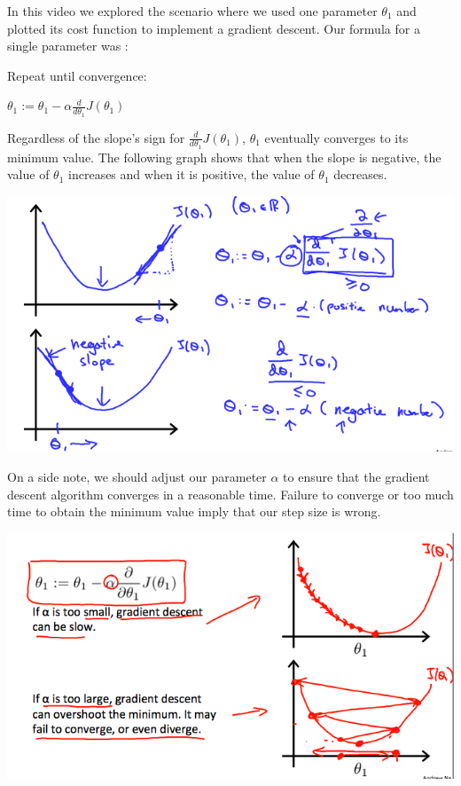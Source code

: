 \documentclass[
]{article}
\begin{document}
In this video we explored the scenario where we used one parameter
\(\theta_1\) and plotted its cost function to implement a gradient
descent. Our formula for a single parameter was :

Repeat until convergence:

\(\theta_1:=\theta_1-\alpha \frac{d}{d\theta_1} J(\theta_1)\)

Regardless of the slope's sign for \(\frac{d}{d\theta_1} J(\theta_1)\),
\(\theta_1\) eventually converges to its minimum value. The following
graph shows that when the slope is negative, the value of \(\theta_1\)
increases and when it is positive, the value of \(\theta_1\) decreases.

\includegraphics{Gradien_Descent_Intution_graph_1.png}

On a side note, we should adjust our parameter \(\alpha\) to ensure that
the gradient descent algorithm converges in a reasonable time. Failure
to converge or too much time to obtain the minimum value imply that our
step size is wrong.

\includegraphics{Gradien_Descent_Intution_graph_2.png}
\end{document}
